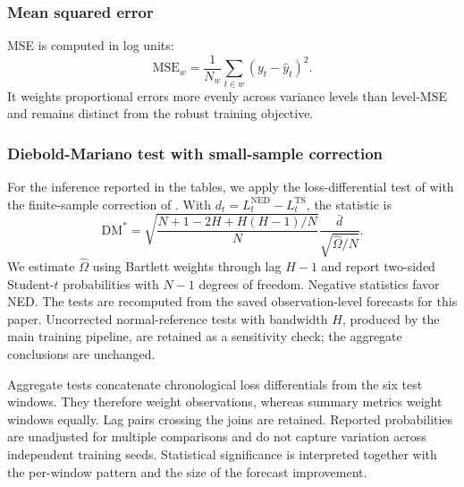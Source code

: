 \subsubsection{Mean squared error}
MSE is computed in log units:
\begin{equation}
 \mathrm{MSE}_w=\frac1{N_w}\sum_{t\in w}(y_t-\hat y_t)^2.\label{eq:mse}
\end{equation}
It weights proportional errors more evenly across variance levels
than level-MSE and remains distinct from the robust training objective.

\subsubsection{Diebold-Mariano test with small-sample correction}
For the inference reported in the tables, we apply the loss-differential
test of \citet{DM_1995} with the finite-sample correction of
\citet{Harvey_1997}. With $d_t=L_t^{\mathrm{NED}}-L_t^{\mathrm{TS}}$,
the statistic is
\begin{equation}
 \mathrm{DM}^{*}=\sqrt{\frac{N+1-2H+H(H-1)/N}{N}}
       \frac{\bar d}{\sqrt{\widehat\Omega/N}}.\label{eq:dm}
\end{equation}
We estimate $\widehat\Omega$ using Bartlett weights through lag
$H-1$ and report two-sided Student-$t$ probabilities with $N-1$
degrees of freedom. Negative statistics favor NED. The tests are
recomputed from the saved observation-level forecasts for this paper.
Uncorrected normal-reference tests with bandwidth $H$, produced by
the main training pipeline, are retained as a sensitivity check; the
aggregate conclusions are unchanged.

Aggregate tests concatenate chronological loss differentials from
the six test windows. They therefore weight observations, whereas
summary metrics weight windows equally. Lag pairs crossing the joins
are retained. Reported probabilities are unadjusted for multiple
comparisons and do not capture variation across independent training
seeds. Statistical significance is interpreted together with the
per-window pattern and the size of the forecast improvement.
